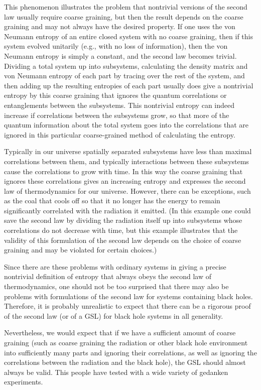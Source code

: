 \documentclass[12pt]{article} \usepackage{latexsym}
\begin{document}
This phenomenon illustrates the problem that nontrivial versions of
the second law usually require coarse graining, but then the result
depends on the coarse graining and may not always have the desired
property.  If one uses the von Neumann entropy of an entire closed
system with no coarse graining, then if this system evolved unitarily
(e.g., with no loss of information), then the von Neumann entropy is
simply a constant, and the second law becomes trivial.  Dividing a
total system up into subsystems, calculating the density matrix and
von Neumann entropy of each part by tracing over the rest of the
system, and then adding up the resulting entropies of each part
usually does give a nontrivial entropy by this coarse graining that
ignores the quantum correlations or entanglements between the
subsystems.  This nontrivial entropy can indeed increase if
correlations between the subsystems grow, so that more of the quantum
information about the total system goes into the correlations that are
ignored in this particular coarse-grained method of calculating the
entropy.

Typically in our universe spatially separated subsystems have less
than maximal correlations between them, and typically interactions
between these subsystems cause the correlations to grow with time.  In
this way the coarse graining that ignores these correlations gives an
increasing entropy and expresses the second law of thermodynamics for
our universe.  However, there can be exceptions, such as the coal that
cools off so that it no longer has the energy to remain significantly
correlated with the radiation it emitted.  (In this example one could
save the second law by dividing the radiation itself up into
subsystems whose correlations do not decrease with time, but this
example illustrates that the validity of this formulation of the
second law depends on the choice of coarse graining and may be
violated for certain choices.)

Since there are these problems with ordinary systems in giving a
precise nontrivial definition of entropy that always obeys the second
law of thermodynamics, one should not be too surprised that there may
also be problems with formulations of the second law for systems
containing black holes.  Therefore, it is probably unrealistic to
expect that there can be a rigorous proof of the second law (or of a
GSL) for black hole systems in all generality.

Nevertheless, we would expect that if we have a sufficient amount of
coarse graining (such as coarse graining the radiation or other black
hole environment into sufficiently many parts and ignoring their
correlations, as well as ignoring the correlations between the
radiation and the black hole), the GSL should almost always be valid.
This people have tested with a wide variety of gedanken experiments.
\end{document}
